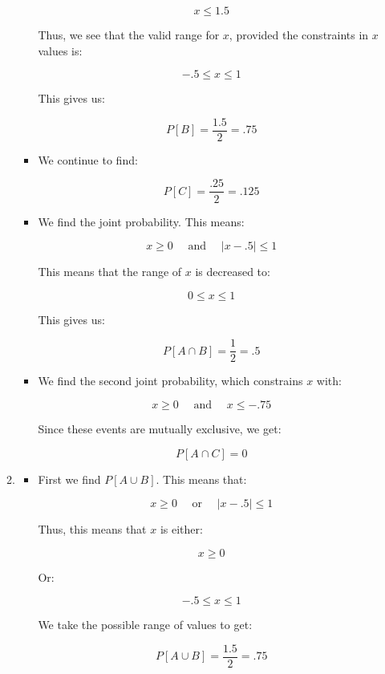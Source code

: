 \begin{enumerate}
\begin{enumerate}
\begin{itemize}
            $$x\leq 1.5$$

            Thus, we see that the valid range for $x$, provided the constraints in $x$ values is:

            $$-.5\leq x\leq1$$

            This gives us:

            $$\boxed{P[B]=\frac{1.5}{2}=.75}$$

          \item We continue to find:

            $$\boxed{P[C]=\frac{.25}{2}=.125}$$

          \item We find the joint probability. This means:

            $$x\geq 0\quad\text{ and }\quad|x-.5|\leq 1$$

            This means that the range of $x$ is decreased to:

            $$0\leq x\leq 1$$

            This gives us:

            $$\boxed{P[A\cap B]=\frac{1}{2}=.5}$$

          \item We find the second joint probability, which constrains $x$ with:

            $$x\geq 0\quad\text{ and }\quad x\leq -.75$$

            Since these events are mutually exclusive, we get:

            $$\boxed{P[A\cap C]=0}$$

        \end{itemize}

      \item 

        \begin{itemize}

          \item First we find $P[A\cup B]$. This means that:

            $$x\geq 0\quad\text{ or }\quad|x-.5|\leq 1$$

            Thus, this means that $x$ is either:

            $$x\geq 0$$

            Or:

            $$-.5\leq x\leq 1$$

            We take the possible range of values to get:

            $$\boxed{P[A\cup B]=\frac{1.5}{2}=.75}$$


\end{itemize}
\end{enumerate}
\end{enumerate}
